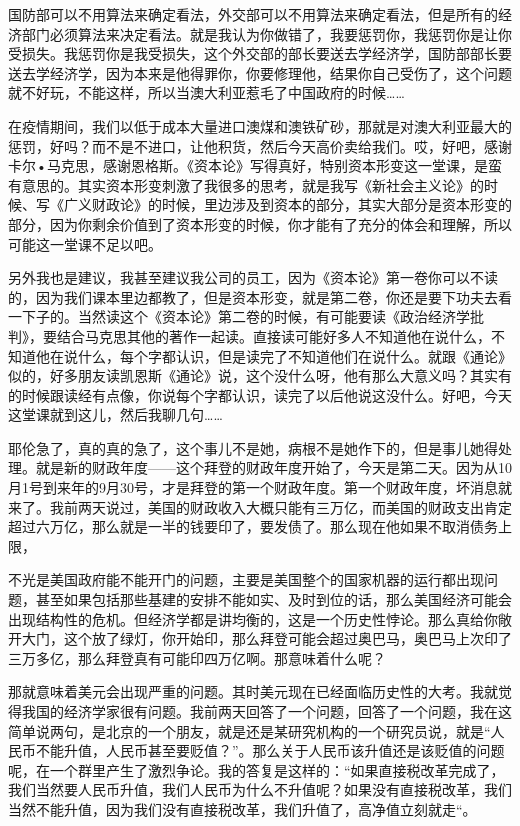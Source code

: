 \documentclass[UTF8, 12pt, a4paper]{ctexrep}
\begin{document}
国防部可以不用算法来确定看法，外交部可以不用算法来确定看法，但是所有的经济部门必须算法来决定看法。就是我认为你做错了，我要惩罚你，我惩罚你是让你受损失。我惩罚你是我受损失，这个外交部的部长要送去学经济学，国防部部长要送去学经济学，因为本来是他得罪你，你要修理他，结果你自己受伤了，这个问题就不好玩，不能这样，所以当澳大利亚惹毛了中国政府的时候……

在疫情期间，我们以低于成本大量进口澳煤和澳铁矿砂，那就是对澳大利亚最大的惩罚，好吗？而不是不进口，让他积货，然后今天高价卖给我们。哎，好吧，感谢卡尔•马克思，感谢恩格斯。《资本论》写得真好，特别资本形变这一堂课，是蛮有意思的。其实资本形变刺激了我很多的思考，就是我写《新社会主义论》的时候、写《广义财政论》的时候，里边涉及到资本的部分，其实大部分是资本形变的部分，因为你剩余价值到了资本形变的时候，你才能有了充分的体会和理解，所以可能这一堂课不足以吧。

另外我也是建议，我甚至建议我公司的员工，因为《资本论》第一卷你可以不读的，因为我们课本里边都教了，但是资本形变，就是第二卷，你还是要下功夫去看一下子的。当然读这个《资本论》第二卷的时候，有可能要读《政治经济学批判》，要结合马克思其他的著作一起读。直接读可能好多人不知道他在说什么，不知道他在说什么，每个字都认识，但是读完了不知道他们在说什么。就跟《通论》似的，好多朋友读凯恩斯《通论》说，这个没什么呀，他有那么大意义吗？其实有的时候跟读经有点像，你说每个字都认识，读完了以后他说这没什么。好吧，今天这堂课就到这儿，然后我聊几句……

耶伦急了，真的真的急了，这个事儿不是她，病根不是她作下的，但是事儿她得处理。就是新的财政年度——这个拜登的财政年度开始了，今天是第二天。因为从10月1号到来年的9月30号，才是拜登的第一个财政年度。第一个财政年度，坏消息就来了。我前两天说过，美国的财政收入大概只能有三万亿，而美国的财政支出肯定超过六万亿，那么就是一半的钱要印了，要发债了。那么现在他如果不取消债务上限，

不光是美国政府能不能开门的问题，主要是美国整个的国家机器的运行都出现问题，甚至如果包括那些基建的安排不能如实、及时到位的话，那么美国经济可能会出现结构性的危机。但经济学都是讲均衡的，这是一个历史性悖论。那么真给你敞开大门，这个放了绿灯，你开始印，那么拜登可能会超过奥巴马，奥巴马上次印了三万多亿，那么拜登真有可能印四万亿啊。那意味着什么呢？

那就意味着美元会出现严重的问题。其时美元现在已经面临历史性的大考。我就觉得我国的经济学家很有问题。我前两天回答了一个问题，回答了一个问题，我在这简单说两句，是北京的一个朋友，就是还是某研究机构的一个研究员说，就是“人民币不能升值，人民币甚至要贬值？”。那么关于人民币该升值还是该贬值的问题呢，在一个群里产生了激烈争论。我的答复是这样的：“如果直接税改革完成了，我们当然要人民币升值，我们人民币为什么不升值呢？如果没有直接税改革，我们当然不能升值，因为我们没有直接税改革，我们升值了，高净值立刻就走“。
\end{document}
